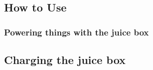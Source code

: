 \documentclass[../jb_user_manual.tex]{subfiles}
\begin{document}
\subsection{How to Use}
\subsubsection{Powering things with the juice box}
\subsection{Charging the juice box}
\end{document}
